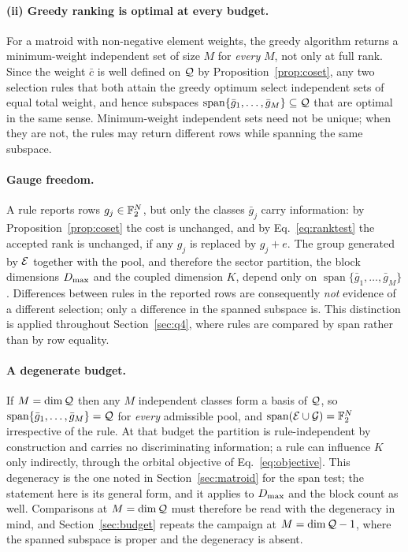 \paragraph{(ii) Greedy ranking is optimal at every budget.}
For a matroid with non-negative element weights, the greedy algorithm returns a
minimum-weight independent set of size $M$ for \emph{every} $M$, not only at
full rank. Since the weight $\bar c$ is well defined on $\mathcal Q$ by
Proposition~\ref{prop:coset}, any two selection rules that both attain the
greedy optimum select independent sets of equal total weight, and hence
subspaces $\operatorname{span}\{\bar g_1,\dots,\bar g_M\}\subseteq\mathcal Q$ that
are optimal in the same sense. Minimum-weight independent sets need not be
unique; when they are not, the rules may return different rows while spanning
the same subspace.

\paragraph{Gauge freedom.}
A rule reports rows $g_j\in\mathbb F_2^{N}$, but only the classes $\bar g_j$ carry
information: by Proposition~\ref{prop:coset} the cost is unchanged, and by
Eq.~\eqref{eq:ranktest} the accepted rank is unchanged, if any $g_j$ is
replaced by $g_j+e$. The group generated by $\mathcal E$ together with the pool,
and therefore the sector partition, the block dimensions $D_{\max}$ and the
coupled dimension $K$, depend only on
$\operatorname{span}\{\bar g_1,\dots,\bar g_M\}$. Differences between rules in
the reported rows are consequently \emph{not} evidence of a different
selection; only a difference in the spanned subspace is. This distinction is
applied throughout Section~\ref{sec:q4}, where rules are compared by span
rather than by row equality.

\paragraph{A degenerate budget.}
If $M=\dim\mathcal Q$ then any $M$ independent classes form a basis of $\mathcal Q$, so
$\operatorname{span}\{\bar g_1,\dots,\bar g_M\}=\mathcal Q$ for \emph{every}
admissible pool, and
$\operatorname{span}(\mathcal E\cup\mathcal G)=\mathbb F_2^{N}$ irrespective of the rule. At that
budget the partition is rule-independent by construction and carries no
discriminating information; a rule can influence $K$ only indirectly, through
the orbital objective of Eq.~\eqref{eq:objective}. This degeneracy is the one
noted in Section~\ref{sec:matroid} for the span test; the statement here is
its general form, and it applies to $D_{\max}$ and the block count as well.
Comparisons at $M=\dim\mathcal Q$ must therefore be read with the degeneracy in
mind, and Section~\ref{sec:budget} repeats the campaign at $M=\dim\mathcal Q-1$,
where the spanned subspace is proper and the degeneracy is absent.
